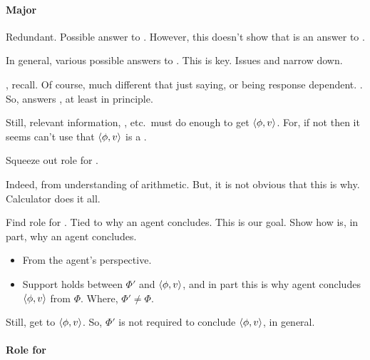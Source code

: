 \paragraph*{Major}

\begin{note}[Major]
  Redundant.
  Possible answer to \qWhy{}.
  However, this doesn't show that is an answer to \qWhy{}.

  In general, various possible answers to \qWhy{}.
  This is key.
  Issues \issueInclusion{} and \issueConstraint{} narrow down.

  \citeauthor{Boghossian:2014aa}, recall.
  Of course, much different that just saying, or being response dependent.
  .
  So, answers \qWhy{}, at least in principle.

  Still, relevant information, \itp{}, etc.\ must do enough to get \(\langle \phi, v \rangle\).
  For, if not then it seems can't use that \(\langle \phi, v \rangle\) is a .

  Squeeze out role for .

  Indeed,  from understanding of arithmetic.
  But, it is not obvious that this is why.
  Calculator does it all.

  Find role for .
  Tied to why an agent concludes.
  This is our goal.
  Show how  is, in part, why an agent concludes.

  \begin{itemize}
  \item
    From the agent's perspective.
  \item
    Support holds between \(\Phi'\) and \(\langle \phi, v \rangle\), and in part this is why agent concludes \(\langle \phi, v \rangle\) from \(\Phi\).
    Where, \(\Phi' \ne \Phi\).
  \end{itemize}

  Still, get to \(\langle \phi, v \rangle\).
  So, \(\Phi'\) is not required to conclude \(\langle \phi, v \rangle\), in general.
\end{note}

\paragraph*{Role for }

